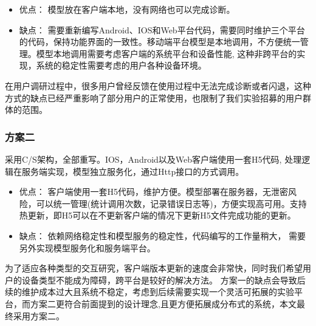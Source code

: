 \begin{itemize}
    \item 优点： 模型放在客户端本地，没有网络也可以完成诊断。

    \item 缺点： 需要重新编写Android、IOS和Web平台代码，需要同时维护三个平台的代码，保持功能界面的一致性。移动端平台模型是本地调用，不方便统一管理。模型本地调用需要考虑客户端的系统平台和设备性能,
这种非跨平台的实现，系统的稳定性需要考虑的用户各种设备环境。
\end{itemize}

在用户调研过程中，很多用户曾经反馈在使用过程中无法完成诊断或者闪退，这种方式的缺点已经严重影响了部分用户的正常使用，也限制了我们实验招募的用户群体的范围。

\subsubsection{方案二}

采用C/S架构，全部重写。IOS，Android以及Web客户端使用一套H5代码, 处理逻辑在服务端实现，模型独立服务化，通过Http接口的方式调用。

\begin{itemize}
    \item 优点： 客户端使用一套H5代码，维护方便。模型部署在服务器，无泄密风险，可以统一管理(统计调用次数，记录错误日志等)，方便实现高可用。支持热更新，即H5可以在不更新客户端的情况下更新H5文件完成功能的更新。

    \item 缺点： 依赖网络稳定性和模型服务的稳定性，代码编写的工作量稍大， 需要另外实现模型服务化和服务端平台。
\end{itemize}

为了适应各种类型的交互研究，客户端版本更新的速度会非常快，同时我们希望用户的设备类型不能成为障碍，跨平台是较好的解决方法。
方案一的缺点会导致后续的维护成本过大且系统不稳定，考虑到后续需要实现一个灵活可拓展的实验平台，而方案二更符合前面提到的设计理念,且更方便拓展成分布式的系统，本文最终采用方案二。

